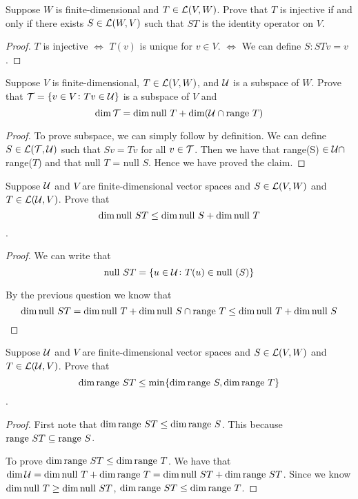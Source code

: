 \documentclass{extarticle}
\begin{document}
\begin{problem}{19}
    Suppose \(W\) is finite-dimensional and \(T \in \mathcal{L}(V, W)\). Prove that 
    \(T\) is injective if and only if there exists \(S \in \mathcal{L}(W, V)\) such that 
    \(ST\) is the identity operator on \(V\).
\end{problem}

\begin{proof}
\(T\) is injective \(\Leftrightarrow\) \(T(v)\) is unique for \(v \in V\). 
\(\Leftrightarrow\) We can define \(S \colon S Tv = v\). 
\end{proof}

\begin{problem}{21}
    Suppose \(V\) is finite-dimensional, \(T \in \mathcal{L}(V, W)\), and \(\mathcal{U}\) is 
    a subspace of \(W\). Prove that \(\mathcal{T} =  \{ v \in V \colon Tv \in \mathcal{U} \}\) is a subspace 
    of \(V\) and 
    \[\dim \mathcal{T} = \dim \text{null } T + \dim (\mathcal{U} \cap \text{range } T)\]
\end{problem}

\begin{proof}
To prove subspace, we can simply follow by definition. We can define 
\(S \in \mathcal{L}(\mathcal{T}, \mathcal{U})\) such that \(S v = T v\) for all \(v \in \mathcal{T}\). Then 
we have that range(S) \(\in \mathcal{U}  \cap\) range(\(T\)) and that null \(T\) = 
null \(S\). Hence we have proved the claim. 
\end{proof}


\begin{problem}{22}
    Suppose \(\mathcal{U}\) and \(V\) are finite-dimensional vector spaces and \(S 
    \in \mathcal{L}(V, W)\) and \(T \in \mathcal{L}(\mathcal{U}, V)\). Prove that 
    \[\dim \text{null } ST \leq \dim \text{null } S + \dim \text{null } T\]. 
\end{problem}

\begin{proof}
We can write that 
\[\text{null } ST = \{u \in \mathcal{U} \colon T(u) \in \text{null } (S)\}\]

By the previous question we know that 
\[\dim \text{null } ST = \dim \text{null } T + \dim \text{null } S \cap \text{range } T \leq \dim \text{null } T + \dim \text{null } S\]
\end{proof}

\begin{problem}{23}
    Suppose \(\mathcal{U}\) and \(V\) are finite-dimensional vector spaces and \(S \in \mathcal{L}(V, W)\)
    and \(T \in \mathcal{L}(\mathcal{U}, V)\). Prove that 
    \[\dim \text{range } ST \leq \min \{\dim \text{range } S, \dim \text{range } T\}\].
\end{problem}

\begin{proof}
First note that \(\dim \text{range } ST \leq \dim \text{range } S\). This because \(\text{range } ST \subseteq \text{range } S\). 

To prove \(\dim \text{range } ST \leq \dim \text{range } T\). We have that \(\dim \mathcal{U} = \dim \text{null } T 
+ \dim \text{range } T = \dim \text{null } ST + \dim \text{range } ST\). Since we know \(\dim \text{null } T \geq \dim \text{null } 
ST\), \(\dim \text{range } ST \leq \dim \text{range } T\). 
\end{proof}
\end{document}
